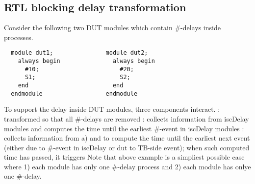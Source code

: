 \documentclass{note}
\begin{document}
\subsection{RTL blocking delay transformation}
Consider the following two DUT modules which contain \#-delays inside
processes. 
\begin{verbatim}
  module dut1;               module dut2;
    always begin               always begin
      #10;                       #20;
      S1;                        S2;
    end                        end
  endmodule                  endmodule
\end{verbatim}
To support the delay inside DUT modules, three components interact.
\bit
\w {}: transformed so that all \#-delays are
removed
\w {}: collects information from iscDelay modules and
computes the time until the earliest \#-event in iscDelay modules
\w {}: collects information from a)
 and  to compute the time until the earliest next event
(either due to \#-event in iscDelay or dut to TB-side event); when such
computed time has passed, it triggers 
\eit
Note that above example is a simpliest possible case where 1) each module has
only one \#-delay process and 2) each module has onlye one \#-delay. 
\end{document}
